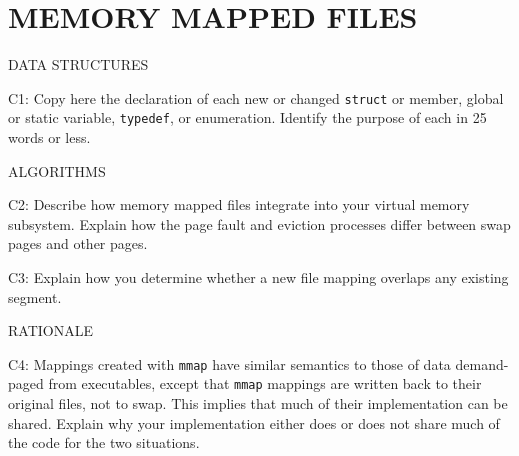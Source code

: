\section*{MEMORY MAPPED FILES}

\begin{aspect}{DATA STRUCTURES}
	\begin{qc}
		C1: Copy here the declaration of each new or changed \lstinline{struct} or member,
		global or static variable, \lstinline{typedef}, or enumeration.
		Identify the purpose of each in 25 words or less.
	\end{qc}

\end{aspect}


\begin{aspect}{ALGORITHMS}
	\begin{qc}
		C2: Describe how memory mapped files integrate into your virtual memory subsystem.
		Explain how the page fault and eviction processes differ between swap pages and other pages.
	\end{qc}

	\begin{qc}
		C3: Explain how you determine whether a new file mapping overlaps any existing segment.
	\end{qc}

\end{aspect}

\begin{aspect}{RATIONALE}
	\begin{qc}
		C4: Mappings created with \lstinline{mmap} have similar semantics to those of data demand-paged from executables,
		except that \lstinline{mmap} mappings are written back to their original files, not to swap.
		This implies that much of their implementation can be shared.
		Explain why your implementation either does or does not share much of the code for the two situations.
	\end{qc}

\end{aspect}


